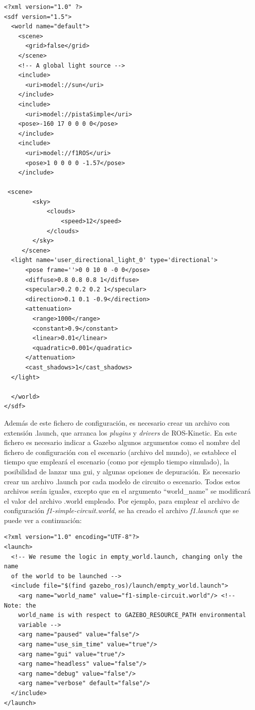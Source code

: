 \vspace{20pt}
\begin{lstlisting}[frame=single]
<?xml version="1.0" ?>
<sdf version="1.5">
  <world name="default">
    <scene>
      <grid>false</grid>
    </scene>
    <!-- A global light source -->
    <include>
      <uri>model://sun</uri>
    </include>
    <include>
      <uri>model://pistaSimple</uri>
	<pose>-160 17 0 0 0 0</pose>
    </include>
    <include>
      <uri>model://f1ROS</uri>
      <pose>1 0 0 0 0 -1.57</pose>
    </include>

 <scene>
        <sky>
            <clouds>
                <speed>12</speed>
            </clouds>
        </sky>
     </scene>
  <light name='user_directional_light_0' type='directional'>
      <pose frame=''>0 0 10 0 -0 0</pose>
      <diffuse>0.8 0.8 0.8 1</diffuse>
      <specular>0.2 0.2 0.2 1</specular>
      <direction>0.1 0.1 -0.9</direction>
      <attenuation>
        <range>1000</range>
        <constant>0.9</constant>
        <linear>0.01</linear>
        <quadratic>0.001</quadratic>
      </attenuation>
      <cast_shadows>1</cast_shadows>
  </light>

  </world>
</sdf>

\end{lstlisting}

Además de este fichero de configuración, es necesario crear un archivo con extensión .launch, que arranca los \textit{plugins} y \textit{drivers} de ROS-Kinetic. En este fichero es necesario indicar a Gazebo algunos argumentos como el nombre del fichero de configuración con el escenario (archivo del mundo), se establece el tiempo que empleará el escenario (como por ejemplo tiempo simulado), la posibilidad de lanzar una \acrshort{gui}, y algunas opciones de depuración. Es necesario crear un archivo .launch por cada modelo de circuito o escenario. Todos estos archivos serán iguales, excepto que en el argumento ``world\_name'' se modificará el valor del archivo .world empleado. Por ejemplo, para emplear el archivo de configuración \textit{f1-simple-circuit.world}, se ha creado el archivo \textit{f1.launch} que se puede ver a continuación:\\

\vspace{20pt}
\begin{lstlisting}[frame=single]
<?xml version="1.0" encoding="UTF-8"?>
<launch>
  <!-- We resume the logic in empty_world.launch, changing only the name 
  of the world to be launched -->
  <include file="$(find gazebo_ros)/launch/empty_world.launch">
    <arg name="world_name" value="f1-simple-circuit.world"/> <!-- Note: the 
    world_name is with respect to GAZEBO_RESOURCE_PATH environmental
    variable -->
    <arg name="paused" value="false"/>
    <arg name="use_sim_time" value="true"/>
    <arg name="gui" value="true"/>
    <arg name="headless" value="false"/>
    <arg name="debug" value="false"/>
    <arg name="verbose" default="false"/>
  </include>  
</launch>
\end{lstlisting}


